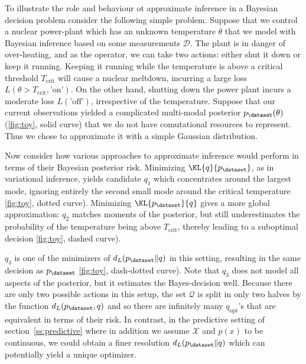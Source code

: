To illustrate the role and behaviour ot approximate inference in a Bayesian decision problem consider the following simple problem. Suppose that we control a nuclear power-plant which has an unknown temperature $\theta$ that we model with Bayesian inference based on some measurements $\mathcal{D}$.
The plant is in danger of over-heating, and as the operator, we can take two actions: either shut it down or keep it running. Keeping it running while the temperature is above a critical threshold $T_\mathrm{crit}$ will cause a nuclear meltdown, incurring a large loss $L(\theta>T_\mathrm{crit},\mbox{'on'})$. On the other hand, shutting down the power plant incurs a moderate loss $L(\mbox{'off'})$, irrespective of the temperature. 
Suppose that our current observations yielded a complicated multi-modal posterior $p_\dataset(\theta)$ (\ref{fig:toy}, solid curve) that we do not have comutational resources to represent. Thus we chose to approximate it with a simple Gaussian distribution.

Now consider how various approaches to approximate inference would perform in terms of their Bayesian posterior risk. Minimizing $\KL{q}{p_\dataset}$, as in variational inference, yields candidate $q_1$ which concentrates around the largest mode, ignoring entirely the second small mode around the critical temperature \ref{fig:toy}, dotted curve). Minimizing $\KL{p_\dataset}{q}$ gives a more global approximation: $q_2$ matches moments of the posterior, but still underestimates the probability of the temperature being above $T_\mathrm{crit}$, thereby leading to a suboptimal decision \ref{fig:toy}, dashed curve).

 $q_3$ is one of the minimizers of $d_L(p_\dataset \| q)$ in this setting, resulting in the same decision as $p_\dataset$ \ref{fig:toy}, dash-dotted curve). Note that $q_3$ does not model all aspects of the posterior, but it estimates the Bayes-decision well. Because there are only two possible actions in this setup, the set $\mathcal{Q}$ is split in only two halves by the function $d_L(p_\dataset,q)$ and so there are infinitely many $q_\mathrm{opt}$'s that are equivalent in terms of their risk. In contrast, in the predictive setting of section~\ref{ss:predictive} where in addition we assume $\mathcal{X}$ and $p(x)$ to be continuous, we could obtain a finer resolution $d_L(p_\dataset \| q)$ which can potentially yield a unique optimizer.

